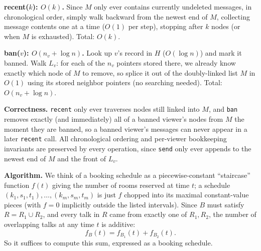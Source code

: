 \documentclass[12pt,twoside]{article}
\begin{document}
\begin{problems}
\textbf{recent($k$): $O(k)$.}
Since $M$ only ever contains currently undeleted messages, in chronological order, simply walk
backward from the newest end of $M$, collecting message contents one at a time ($O(1)$ per step),
stopping after $k$ nodes (or when $M$ is exhausted). Total: $O(k)$.

\textbf{ban($v$): $O(n_v + \log n)$.}
Look up $v$'s record in $H$ ($O(\log n)$) and mark it banned. Walk $L_v$: for each of the $n_v$
pointers stored there, we already know exactly which node of $M$ to remove, so splice it out of
the doubly-linked list $M$ in $O(1)$ using its stored neighbor pointers (no searching needed).
Total: $O(n_v + \log n)$.

\textbf{Correctness.}
\texttt{recent} only ever traverses nodes still linked into $M$, and \texttt{ban} removes exactly
(and immediately) all of a banned viewer's nodes from $M$ the moment they are banned, so a
banned viewer's messages can never appear in a later \texttt{recent} call. All chronological
ordering and per-viewer bookkeeping invariants are preserved by every operation, since \texttt{send}
only ever appends to the newest end of $M$ and the front of $L_v$.

\newpage

\problem  %
\begin{problemparts}

\problempart
\textbf{Algorithm.}
We think of a booking schedule as a piecewise-constant ``staircase'' function
$f(t)$ giving the number of rooms reserved at time $t$; a schedule\\
$(k_1,s_1,t_1),\dots,(k_m,s_m,t_m)$ is just $f$ chopped into its maximal
constant-value pieces (with $f=0$ implicitly outside the listed intervals).
Since $B$ must satisfy $R = R_1 \cup R_2$, and every talk in $R$ came from
exactly one of $R_1,R_2$, the number of overlapping talks at any time $t$ is
additive:
$$f_B(t) = f_{B_1}(t) + f_{B_2}(t).$$
So it suffices to compute this sum, expressed as a booking schedule.


\end{problemparts}
\end{problems}
\end{document}
